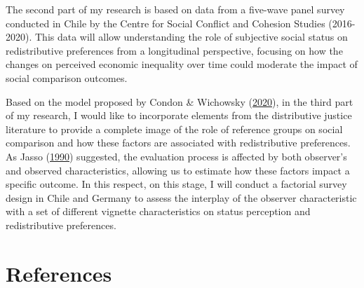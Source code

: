 \documentclass[
  12pt,
]{book}
\begin{document}
The second part of my research is based on data from a five-wave panel survey conducted in Chile by the Centre for Social Conflict and Cohesion Studies (2016-2020). This data will allow understanding the role of subjective social status on redistributive preferences from a longitudinal perspective, focusing on how the changes on perceived economic inequality over time could moderate the impact of social comparison outcomes.

Based on the model proposed by Condon \& Wichowsky (\protect\hyperlink{ref-Condon2020}{2020}), in the third part of my research, I would like to incorporate elements from the distributive justice literature to provide a complete image of the role of reference groups on social comparison and how these factors are associated with redistributive preferences. As Jasso (\protect\hyperlink{ref-Jasso1990}{1990}) suggested, the evaluation process is affected by both observer's and observed characteristics, allowing us to estimate how these factors impact a specific outcome. In this respect, on this stage, I will conduct a factorial survey design in Chile and Germany to assess the interplay of the observer characteristic with a set of different vignette characteristics on status perception and redistributive preferences.

\hypertarget{references}{%
\chapter*{References}\label{references}}
\end{document}
